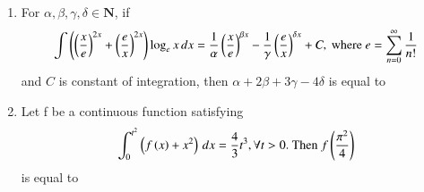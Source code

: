 \documentclass[journal]{IEEEtran}
\numberwithin{equation}{enumi}
\numberwithin{figure}{enumi}
\begin{document}
\begin{enumerate}
    \hfill{}

    \begin{enumerate}
    \end{enumerate}

    \item 
    For $\alpha, \beta, \gamma, \delta \in \mathbf{N}$, if
    \begin{align*}
         \int \left(\left(\frac{x}{e}\right)^{2x} + \left(\frac{e}{x}\right)^{2x}\right) \log_ex \, dx = \frac{1}{\alpha}\left(\frac{x}{e}\right)^{\beta x} - \frac{1}{\gamma}\left(\frac{e}{x}\right)^{\delta x} + C, \text{ where } e = \sum_{n = 0}^\infty \frac{1}{n!}
    \end{align*}
    and $C$ is constant of integration, then $\alpha + 2\beta + 3\gamma - 4\delta$ is equal to

    \hfill{}

    \begin{enumerate}
    \end{enumerate}

    \item 
    Let f be a continuous function satisfying
    \begin{align*}
        \int_0^{t^2} \left(f\left(x\right) + x^2\right) \, dx = \frac{4}{3}t^3, \forall t > 0. \text{ Then } f\left(\frac{\pi^2}{4}\right)
    \end{align*}
    is equal to

    \hfill{}

    \begin{enumerate}
    \end{enumerate}
    
    
\end{enumerate}
\end{document}
